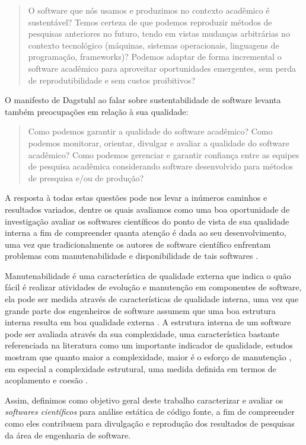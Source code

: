 \begin{quote}
  O software que nós usamos e produzimos no contexto acadêmico é sustentável?
  Temos certeza de que podemos reproduzir métodos de pesquisas anteriores no
  futuro, tendo em vistas mudanças arbitrárias no contexto tecnológico
  (máquinas, sistemas operacionais, linguagens de programação, frameworks)?
  Podemos adaptar de forma incremental o software acadêmico para
  aproveitar oportunidades emergentes, sem perda de reprodutibilidade e
  sem custos proibitivos?
\end{quote}

O manifesto de Dagstuhl ao falar sobre sustentabilidade de software levanta também preocupações em relação à sua qualidade:

\begin{quote}
  Como podemos garantir a qualidade do software acadêmico? Como podemos
  monitorar, orientar, divulgar e avaliar a qualidade do software acadêmico?
  Como podemos gerenciar e garantir confiança entre as equipes de pesquisa
  acadêmica considerando software desenvolvido para métodos de presquisa e/ou
  de produção?
\end{quote}

A resposta à todas estas questões pode nos levar a inúmeros caminhos e
resultados variados, dentre os quais avaliamos como uma boa oportunidade de
investigação avaliar os softwares científicos do ponto de vista de sua
qualidade interna a fim de compreender quanta atenção é dada ao seu
desenvolvimento, uma vez que tradicionalmente os autores de software científico
enfrentam problemas com manutenabilidade e disponibilidade de tais softwares
\cite{Prlic2012}.

Manutenabilidade é uma característica de qualidade externa que indica o quão
fácil é realizar atividades de evolução e manutenção em componentes de
software, ela pode ser medida através de características de qualidade interna,
uma vez que grande parte dos engenheiros de software assumem que uma boa
estrutura interna resulta em boa qualidade externa \cite{Fenton2014}. A
estrutura interna de um software pode ser avaliada através da sua complexidade,
uma característica bastante referenciada na literatura como um importante
indicador de qualidade, estudos mostram que quanto maior a complexidade, maior
é o esforço de manutenção \cite{hashim1996software, Darcy2005}, em especial a
complexidade estrutural, uma medida definida em termos de acoplamento e coesão
\cite{Terceiro2012}.

Assim, definimos como objetivo geral deste trabalho caracterizar e avaliar os
{\it softwares científicos} para análise estática de código fonte, a fim de
compreender como eles contribuem para divulgação e reprodução dos resultados de
pesquisas da área de engenharia de software.

